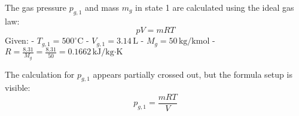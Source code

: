 The gas pressure \( p_{g,1} \) and mass \( m_g \) in state 1 are calculated using the ideal gas law:  
\[
pV = mRT
\]  
Given:  
- \( T_{g,1} = 500^\circ\text{C} \)  
- \( V_{g,1} = 3.14 \, \text{L} \)  
- \( M_g = 50 \, \text{kg/kmol} \)  
- \( R = \frac{8.31}{M_g} = \frac{8.31}{50} = 0.1662 \, \text{kJ/kg·K} \)  

The calculation for \( p_{g,1} \) appears partially crossed out, but the formula setup is visible:  
\[
p_{g,1} = \frac{mRT}{V}
\]